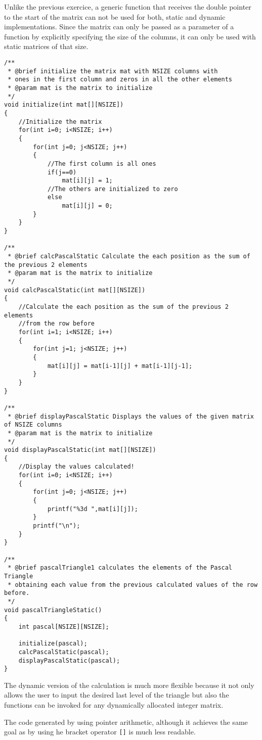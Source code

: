 \documentclass{article}
\begin{document}
Unlike the previous exercice, a generic function that receives
the double pointer to the start of the matrix can not be used for both,
static and dynamic implementations. Since the matrix can only be 
passed as a parameter of a function by explicitly specifying the size
of the columns, it can only be used with static matrices
of that size. 

\begin{lstlisting}[label=pastat,caption=Pascal Static]
/**
 * @brief initialize the matrix mat with NSIZE columns with
 * ones in the first column and zeros in all the other elements
 * @param mat is the matrix to initialize
 */
void initialize(int mat[][NSIZE])
{
	//Initialize the matrix
	for(int i=0; i<NSIZE; i++)
	{
		for(int j=0; j<NSIZE; j++)
		{
			//The first column is all ones
			if(j==0)
				mat[i][j] = 1;
			//The others are initialized to zero
			else
				mat[i][j] = 0;
		}
	}
}

/**
 * @brief calcPascalStatic Calculate the each position as the sum of the previous 2 elements
 * @param mat is the matrix to initialize
 */
void calcPascalStatic(int mat[][NSIZE])
{
	//Calculate the each position as the sum of the previous 2 elements
	//from the row before
	for(int i=1; i<NSIZE; i++)
	{
		for(int j=1; j<NSIZE; j++)
		{
			mat[i][j] = mat[i-1][j] + mat[i-1][j-1];
		}
	}
}

/**
 * @brief displayPascalStatic Displays the values of the given matrix of NSIZE columns
 * @param mat is the matrix to initialize
 */
void displayPascalStatic(int mat[][NSIZE])
{
	//Display the values calculated!
	for(int i=0; i<NSIZE; i++)
	{
		for(int j=0; j<NSIZE; j++)
		{
			printf("%3d ",mat[i][j]);
		}
		printf("\n");
	}
}

/**
 * @brief pascalTriangle1 calculates the elements of the Pascal Triangle
 * obtaining each value from the previous calculated values of the row before.
 */
void pascalTriangleStatic()
{
	int pascal[NSIZE][NSIZE];

	initialize(pascal);
	calcPascalStatic(pascal);
	displayPascalStatic(pascal);
}

\end{lstlisting} 

The dynamic version of the calculation is much more flexible because
it not only allows the user to input the desired last level of the triangle
but also the functions can be invoked for any dynamically allocated integer
matrix.

The code generated by using pointer arithmetic, although it achieves
the same goal as by using he bracket operator \verb+[]+ is much less readable.
\end{document}
